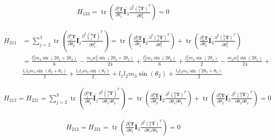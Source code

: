 \documentclass{homework}
\begin{document}
\begin{sol}
\begin{align*}
  H_{133} = \operatorname{tr} (\frac{\partial {^0_3}\mathbf{T}}{\partial \theta_1} \overline{\mathbf{I}_3} \frac{\partial^2 ({^0_3}\mathbf{T})^T}{\partial \theta_3^2}) 
          = 0
\end{align*}

\begin{align*}
  H_{211} &= \sum_{j=2}^3 \operatorname{tr} (\frac{\partial {^0_j}\mathbf{T}}{\partial \theta_2} \overline{\mathbf{I}_j} \frac{\partial^2 ({^0_j}\mathbf{T})^T}{\partial \theta_1^2}) 
          = \operatorname{tr} (\frac{\partial {^0_2}\mathbf{T}}{\partial \theta_2} \overline{\mathbf{I}_2} \frac{\partial^2 ({^0_2}\mathbf{T})^T}{\partial \theta_1^2}) + \operatorname{tr} (\frac{\partial {^0_3}\mathbf{T}}{\partial \theta_2} \overline{\mathbf{I}_3} \frac{\partial^2 ({^0_3}\mathbf{T})^T}{\partial \theta_1^2}) \\
          &= \frac{l_3^2 m_3 \sin(2\theta_2 + 2\theta_3)}{6} - \frac{m_3 w_3^2 \sin(2\theta_2 + 2\theta_3)}{24} + \frac{l_2^2 m_2 \sin(2\theta_2)}{6} + \frac{l_2^2 m_3 \sin(2\theta_2)}{2} - \frac{m_2 w_2^2 \sin(2\theta_2)}{24} + \\
          & \frac{l_1 l_3 m_3 \sin(\theta_2 + \theta_3)}{2} + \frac{l_1 l_2 m_2 \sin(\theta_2)}{2} + l_1 l_2 m_3 \sin(\theta_2) + \frac{l_2 l_3 m_3 \sin(2\theta_2 + \theta_3)}{2}
\end{align*}

\begin{align*}
  H_{212} = H_{221} = \sum_{j=2}^3 \operatorname{tr} (\frac{\partial {^0_j}\mathbf{T}}{\partial \theta_2} \overline{\mathbf{I}_j} \frac{\partial^2 ({^0_j}\mathbf{T})^T}{\partial \theta_1 \partial \theta_2}) 
                    = \operatorname{tr} (\frac{\partial {^0_2}\mathbf{T}}{\partial \theta_2} \overline{\mathbf{I}_2} \frac{\partial^2 ({^0_2}\mathbf{T})^T}{\partial \theta_1 \partial \theta_2}) + \operatorname{tr} (\frac{\partial {^0_3}\mathbf{T}}{\partial \theta_2} \overline{\mathbf{I}_3} \frac{\partial^2 ({^0_3}\mathbf{T})^T}{\partial \theta_1 \partial \theta_2})
                    = 0
\end{align*}

\begin{align*}
  H_{213} = H_{231} = \operatorname{tr} (\frac{\partial {^0_3}\mathbf{T}}{\partial \theta_2} \overline{\mathbf{I}_3} \frac{\partial^2 ({^0_3}\mathbf{T})^T}{\partial \theta_1 \partial \theta_3}) 
                    = 0
\end{align*}


\end{sol}
\end{document}
